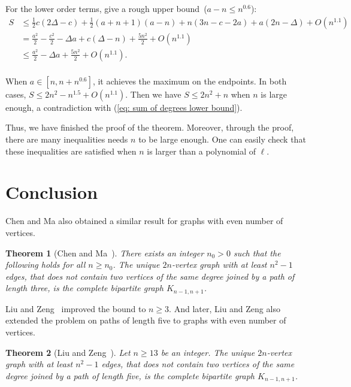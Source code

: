\documentclass[12pt]{article}%
\newtheorem{theorem}{Theorem}[section]
\begin{document}
For the lower order terms, give a rough upper bound~($a -n \le n^{0.6}$):
\begin{equation*}
\begin{aligned}
	S & \le \frac{1}{2}c(2\Delta - c) + \frac{1}{2}(a+n+1)(a-n) + n (3n-c-2a) + a(2n-\Delta) + O(n^{1.1})\\
	& =  \frac{a^{2}}{2} - \frac{c^{2}}{2} - \Delta a + c(\Delta  - n) + \frac{5 n^{2}}{2} + O(n^{1.1})\\
	& \le \frac{a^{2}}{2} - \Delta a + \frac{5 n^{2}}{2} + O(n^{1.1}).\\
\end{aligned}
\end{equation*}

When $a \in [n, n + n^{0.6}]$, it achieves the maximum on the endpoints.
In both cases, $S \le 2n^2 - n^{1.5} +O(n^{1.1})$.
Then we have $S \le 2n^2 + n$ when $n$ is large enough, a contradiction  with (\ref{eq: sum of degrees lower bound}).

Thus, we have finished the proof of the theorem.
Moreover, through the proof, there are many inequalities needs $n$ to be large enough.
One can easily check that these inequalities are satisfied when $n$ is larger than a polynomial of $\ell$.

\section{Conclusion}\label{Conclusion}

Chen and Ma \cite{CHEN20261} also obtained a similar result for graphs with even number of vertices.
\begin{theorem}[Chen and Ma~\cite{CHEN20261}]
	There exists an integer $n_0 >0$ such that the following holds for all $n \ge n_0$.
	The unique $2n$-vertex graph with at least $n^2-1$ edges, that does not contain two vertices of the same degree joined by a path of length three, is the complete bipartite graph $K_{n-1,n+1}$.
\end{theorem}

Liu and Zeng~\cite{2025arXiv250500523L} improved the bound to $n \ge 3$.
And later, Liu and Zeng also extended the problem on paths of length five to graphs with even number of vertices.

\begin{theorem}[Liu and Zeng~\cite{2026arXiv260411664L}]
	Let $n \ge 13$ be an integer. The unique $2n$-vertex graph with at least $n^2-1$ edges, that does not contain two vertices of the same degree joined by a path of length five, is the complete bipartite graph $K_{n-1,n+1}$.
\end{theorem}
\end{document}
